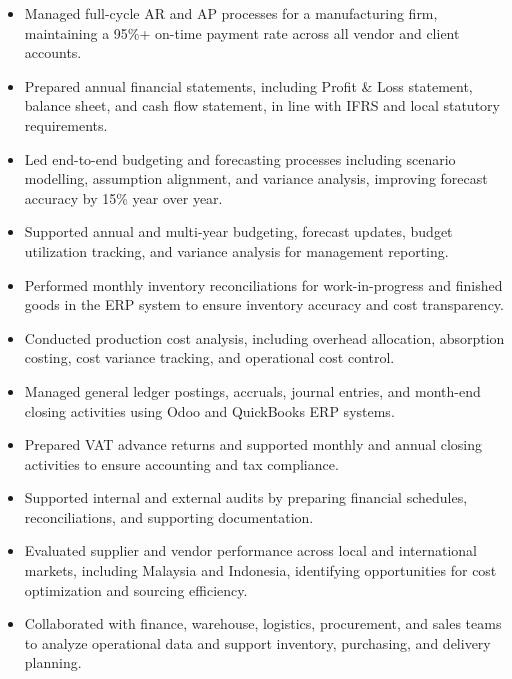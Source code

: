 \documentclass[a4paper,10pt]{article}
\begin{document}
\begin{itemize}[itemsep=0pt, topsep=0pt, leftmargin=2em]

\item Managed full-cycle AR and AP processes for a manufacturing firm, maintaining a 95\%+ on-time payment rate across all vendor and client accounts.

\item Prepared annual financial statements, including Profit \& Loss statement, balance sheet, and cash flow statement, in line with IFRS and local statutory requirements.

\item Led end-to-end budgeting and forecasting processes including scenario modelling, assumption alignment, and variance analysis, improving forecast accuracy by 15\% year over year.

\item Supported annual and multi-year budgeting, forecast updates, budget utilization tracking, and variance analysis for management reporting.

\item Performed monthly inventory reconciliations for work-in-progress and finished goods in the ERP system to ensure inventory accuracy and cost transparency.

\item Conducted production cost analysis, including overhead allocation, absorption costing, cost variance tracking, and operational cost control.

\item Managed general ledger postings, accruals, journal entries, and month-end closing activities using Odoo and QuickBooks ERP systems.

\item Prepared VAT advance returns and supported monthly and annual closing activities to ensure accounting and tax compliance.

\item Supported internal and external audits by preparing financial schedules, reconciliations, and supporting documentation.

\item Evaluated supplier and vendor performance across local and international markets, including Malaysia and Indonesia, identifying opportunities for cost optimization and sourcing efficiency.

\item Collaborated with finance, warehouse, logistics, procurement, and sales teams to analyze operational data and support inventory, purchasing, and delivery planning.


\end{itemize}
\end{document}
